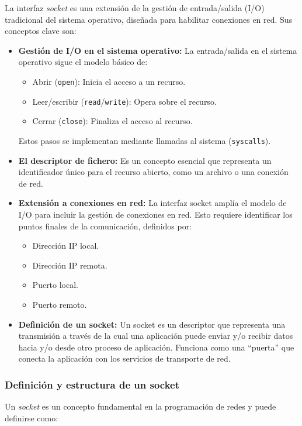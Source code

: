 \documentclass[a4paper,12pt]{article}
\begin{document}
La interfaz \emph{socket} es una extensión de la gestión de entrada/salida (I/O) tradicional del sistema operativo, diseñada para habilitar conexiones en red. Sus conceptos clave son:

\begin{itemize}
    \item \textbf{Gestión de I/O en el sistema operativo:} La entrada/salida en el sistema operativo sigue el modelo básico de:
    \begin{itemize}
        \item Abrir (\texttt{open}): Inicia el acceso a un recurso.
        \item Leer/escribir (\texttt{read}/\texttt{write}): Opera sobre el recurso.
        \item Cerrar (\texttt{close}): Finaliza el acceso al recurso.
    \end{itemize}
    Estos pasos se implementan mediante llamadas al sistema (\texttt{syscalls}).
    \item \textbf{El descriptor de fichero:} Es un concepto esencial que representa un identificador único para el recurso abierto, como un archivo o una conexión de red.
    \item \textbf{Extensión a conexiones en red:} La interfaz socket amplía el modelo de I/O para incluir la gestión de conexiones en red. Esto requiere identificar los puntos finales de la comunicación, definidos por:
    \begin{itemize}
        \item Dirección IP local.
        \item Dirección IP remota.
        \item Puerto local.
        \item Puerto remoto.
    \end{itemize}
    \item \textbf{Definición de un socket:} Un socket es un descriptor que representa una transmisión a través de la cual una aplicación puede enviar y/o recibir datos hacia y/o desde otro proceso de aplicación. Funciona como una “puerta” que conecta la aplicación con los servicios de transporte de red.
\end{itemize}

\subsubsection{Definición y estructura de un socket}

Un \emph{socket} es un concepto fundamental en la programación de redes y puede definirse como:
\end{document}
